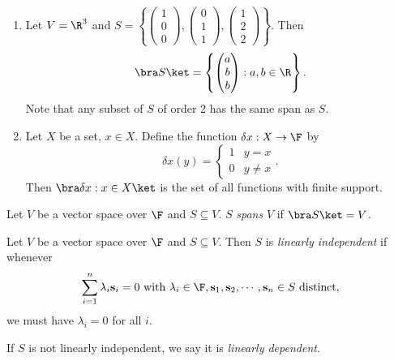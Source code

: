 \documentclass[a4paper]{article}
\begin{document}
\begin{eg}\leavevmode
  \begin{enumerate}
    \item Let $V = \R^3$ and $S = \left\{\begin{pmatrix}1\\0\\0\end{pmatrix}, \begin{pmatrix}0\\1\\1\end{pmatrix}, \begin{pmatrix}1\\2\\2\end{pmatrix}\right\}$. Then
      \[
        \bra S\ket = \left\{
          \begin{pmatrix}
            a\\b\\b\\
          \end{pmatrix}: a, b\in \R
        \right\}.
      \]
      Note that any subset of $S$ of order 2 has the same span as $S$.
    \item Let $X$ be a set, $x \in X$. Define the function $\delta x: X\to \F$ by
      \[
        \delta x(y) =
        \begin{cases}
          1 & y = x\\
          0 & y\not= x
        \end{cases}.
      \]
      Then $\bra \delta x: x \in X\ket$ is the set of all functions with finite support.
  \end{enumerate}
\end{eg}

\begin{defi}
  Let $V$ be a vector space over $\F$ and $S\subseteq V$. $S$ \emph{spans} $V$ if $\bra S\ket = V$.
\end{defi}

\begin{defi}
  Let $V$ be a vector space over $\F$ and $S\subseteq V$. Then $S$ is \emph{linearly independent} if whenever
  \[
    \sum_{i = 1}^n \lambda_i \mathbf{s}_i = 0\text{ with } \lambda_i \in \F, \mathbf{s}_1, \mathbf{s}_2, \cdots, \mathbf{s}_n \in S\text{ distinct},
  \]
  we must have $\lambda_i = 0$ for all $i$.

  If $S$ is not linearly independent, we say it is \emph{linearly dependent}.
\end{defi}
\end{document}
